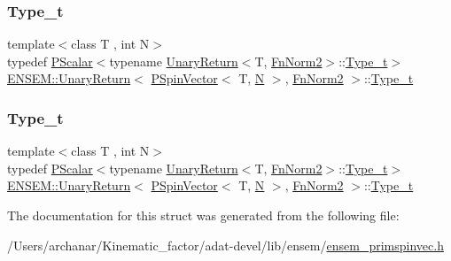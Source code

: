 \subsubsection{\texorpdfstring{Type\_t}{Type\_t}\hspace{0.1cm}{\footnotesize\ttfamily [2/3]}}
{\footnotesize\ttfamily template$<$class T , int N$>$ \\
typedef \mbox{\hyperlink{classENSEM_1_1PScalar}{P\+Scalar}}$<$typename \mbox{\hyperlink{structENSEM_1_1UnaryReturn}{Unary\+Return}}$<$T, \mbox{\hyperlink{structENSEM_1_1FnNorm2}{Fn\+Norm2}}$>$\+::\mbox{\hyperlink{structENSEM_1_1UnaryReturn_3_01PSpinVector_3_01T_00_01N_01_4_00_01FnNorm2_01_4_ac4b3c3fbd1e791cd12922af9afc970f9}{Type\+\_\+t}}$>$ \mbox{\hyperlink{structENSEM_1_1UnaryReturn}{E\+N\+S\+E\+M\+::\+Unary\+Return}}$<$ \mbox{\hyperlink{classENSEM_1_1PSpinVector}{P\+Spin\+Vector}}$<$ T, \mbox{\hyperlink{adat__devel_2lib_2hadron_2operator__name__util_8cc_a7722c8ecbb62d99aee7ce68b1752f337}{N}} $>$, \mbox{\hyperlink{structENSEM_1_1FnNorm2}{Fn\+Norm2}} $>$\+::\mbox{\hyperlink{structENSEM_1_1UnaryReturn_3_01PSpinVector_3_01T_00_01N_01_4_00_01FnNorm2_01_4_ac4b3c3fbd1e791cd12922af9afc970f9}{Type\+\_\+t}}}

\mbox{\label{structENSEM_1_1UnaryReturn_3_01PSpinVector_3_01T_00_01N_01_4_00_01FnNorm2_01_4_ac4b3c3fbd1e791cd12922af9afc970f9}} 
\subsubsection{\texorpdfstring{Type\_t}{Type\_t}\hspace{0.1cm}{\footnotesize\ttfamily [3/3]}}
{\footnotesize\ttfamily template$<$class T , int N$>$ \\
typedef \mbox{\hyperlink{classENSEM_1_1PScalar}{P\+Scalar}}$<$typename \mbox{\hyperlink{structENSEM_1_1UnaryReturn}{Unary\+Return}}$<$T, \mbox{\hyperlink{structENSEM_1_1FnNorm2}{Fn\+Norm2}}$>$\+::\mbox{\hyperlink{structENSEM_1_1UnaryReturn_3_01PSpinVector_3_01T_00_01N_01_4_00_01FnNorm2_01_4_ac4b3c3fbd1e791cd12922af9afc970f9}{Type\+\_\+t}}$>$ \mbox{\hyperlink{structENSEM_1_1UnaryReturn}{E\+N\+S\+E\+M\+::\+Unary\+Return}}$<$ \mbox{\hyperlink{classENSEM_1_1PSpinVector}{P\+Spin\+Vector}}$<$ T, \mbox{\hyperlink{adat__devel_2lib_2hadron_2operator__name__util_8cc_a7722c8ecbb62d99aee7ce68b1752f337}{N}} $>$, \mbox{\hyperlink{structENSEM_1_1FnNorm2}{Fn\+Norm2}} $>$\+::\mbox{\hyperlink{structENSEM_1_1UnaryReturn_3_01PSpinVector_3_01T_00_01N_01_4_00_01FnNorm2_01_4_ac4b3c3fbd1e791cd12922af9afc970f9}{Type\+\_\+t}}}



The documentation for this struct was generated from the following file\+:\begin{DoxyCompactItemize}
\item 
/\+Users/archanar/\+Kinematic\+\_\+factor/adat-\/devel/lib/ensem/\mbox{\hyperlink{adat-devel_2lib_2ensem_2ensem__primspinvec_8h}{ensem\+\_\+primspinvec.\+h}}\end{DoxyCompactItemize}
